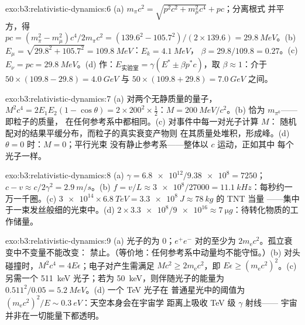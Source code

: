 \begin{solution}{exo:b3:relativistic-dynamics:6}
(a) $m_\pi c^2 = \sqrt{p^2c^2 + m_\mu^2c^4} + pc$；分离根式
并平方，得 $pc = (m_\pi^2 - m_\mu^2)c^4/2m_\pi c^2 =
(139.6^2 - 105.7^2)/(2 \times 139.6) = \qty{29.8}{MeV}$。(b) $E_\mu =
\sqrt{29.8^2 + 105.7^2} = \qty{109.8}{MeV}$：$E_k = \qty{4.1}{MeV}$，
$\beta = 29.8/109.8 = 0.27$。(c) $E_\nu = pc = \qty{29.8}{MeV}$。(d)
作：$E_{\text{实验室}} = \gamma(E^* \pm \beta p^*c)$，取 $\beta
\approx 1$：介于 $50 \times (109.8 - 29.8) = \qty{4.0}{GeV}$ 与
$50 \times (109.8 + 29.8) = \qty{7.0}{GeV}$ 之间。
\end{solution}

\begin{solution}{exo:b3:relativistic-dynamics:7}
(a) 对两个无静质量的量子，$M^2c^4 = 2E_1E_2(1 - \cos\theta) =
2 \times 200^2 \times \tfrac12$：$M = \qty{200}{MeV}/c^2$。(b)
恰为 $m_{\pi^0}$——即粒子的质量，
在任何参考系中都相同。(c) 对事件中每一对光子计算 $M$：
随机配对的结果平缓分布，而粒子的真实衰变产物则
在其质量处堆积，形成峰。(d) $\theta = 0$ 时：$M = 0$；平行光束
没有静止参考系——整体以 $c$ 运动，正如其中
每个光子一样。
\end{solution}

\begin{solution}{exo:b3:relativistic-dynamics:8}
(a) $\gamma = \num{6.8e12}/\num{9.38e8} = 7250$；$c - v \approx
c/2\gamma^2 = \qty{2.9}{m/s}$。(b) $f = v/L \approx \num{3e8}/27000 =
\qty{11.1}{kHz}$：每秒约一万一千圈。(c) $\num{3e14}
\times \qty{6.8}{TeV} = \qty{3.3e8}{J} \approx \qty{78}{kg}$ 的 TNT 当量
——集中于一束发丝般细的光束中。(d) $2 \times \num{3.3e8}/\num{9e16} \approx
\qty{7}{\micro g}$：待转化物质的工作储量。
\end{solution}

\begin{solution}{exo:b3:relativistic-dynamics:9}
(a) 光子的为 $0$；$e^+e^-$ 对的至少为
$2m_{\text{e}}c^2$。孤立衰变中不变量不能改变：
禁止。（等价地：任何参考系中动量均不能守恒。）(b)
对头碰撞时，$M^2c^4 = 4E\epsilon$；电子对产生需满足 $Mc^2 \ge
2m_{\text{e}}c^2$，即 $E\epsilon \ge (m_{\text{e}}c^2)^2$。(c)
另需一个 \qty{511}{keV} 光子；若为 \qty{50}{keV}，则伴随光子的能量为
$0.511^2/0.05 = \qty{5.2}{MeV}$。(d) 一个 TeV 光子在
普通星光中的阈值为 $(m_{\text{e}}c^2)^2/E \sim \qty{0.3}{eV}$：天空本身会在宇宙学
距离上吸收 TeV 级 $\gamma$ 射线——
宇宙并非在一切能量下都透明。
\end{solution}

